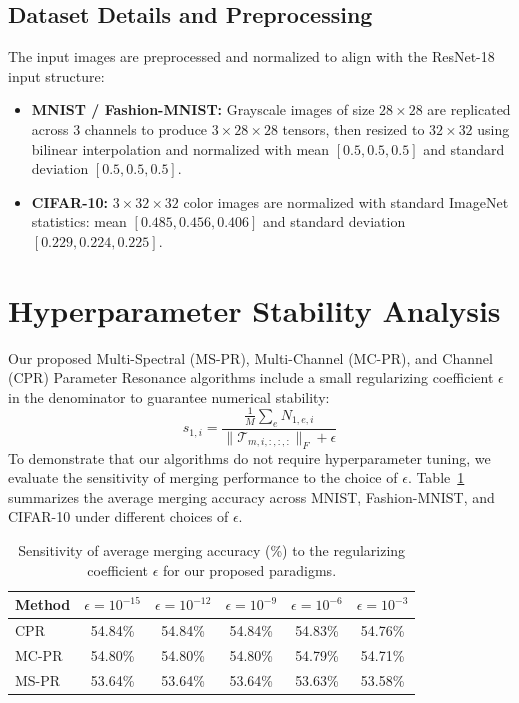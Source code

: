 \documentclass{article}
\theoremstyle{plain}
\theoremstyle{definition}
\theoremstyle{remark}
\begin{document}
\subsection{Dataset Details and Preprocessing}
The input images are preprocessed and normalized to align with the ResNet-18 input structure:
\begin{itemize}
    \item \textbf{MNIST / Fashion-MNIST:} Grayscale images of size $28 \times 28$ are replicated across 3 channels to produce $3 \times 28 \times 28$ tensors, then resized to $32 \times 32$ using bilinear interpolation and normalized with mean $[0.5, 0.5, 0.5]$ and standard deviation $[0.5, 0.5, 0.5]$.
    \item \textbf{CIFAR-10:} $3 \times 32 \times 32$ color images are normalized with standard ImageNet statistics: mean $[0.485, 0.456, 0.406]$ and standard deviation $[0.229, 0.224, 0.225]$.
\end{itemize}

\section{Hyperparameter Stability Analysis}
\label{appendix:stability}
Our proposed Multi-Spectral (MS-PR), Multi-Channel (MC-PR), and Channel (CPR) Parameter Resonance algorithms include a small regularizing coefficient $\epsilon$ in the denominator to guarantee numerical stability:
\begin{equation}
    s_{1, i} = \frac{\frac{1}{M}\sum_e N_{1, e, i}}{\|\mathcal{T}_{m, i, :, :, :}\|_F + \epsilon}
\end{equation}
To demonstrate that our algorithms do not require hyperparameter tuning, we evaluate the sensitivity of merging performance to the choice of $\epsilon$. Table~\ref{tab:epsilon_sensitivity} summarizes the average merging accuracy across MNIST, Fashion-MNIST, and CIFAR-10 under different choices of $\epsilon$.

\begin{table}[h]
\caption{Sensitivity of average merging accuracy (\%) to the regularizing coefficient $\epsilon$ for our proposed paradigms.}
\label{tab:epsilon_sensitivity}
\vskip 0.1in
\begin{center}
\begin{small}
\begin{sc}
\begin{tabular}{lccccc}
\toprule
Method & $\epsilon = 10^{-15}$ & $\epsilon = 10^{-12}$ & $\epsilon = 10^{-9}$ & $\epsilon = 10^{-6}$ & $\epsilon = 10^{-3}$ \\
\midrule
CPR & 54.84\% & 54.84\% & 54.84\% & 54.83\% & 54.76\% \\
MC-PR & 54.80\% & 54.80\% & 54.80\% & 54.79\% & 54.71\% \\
MS-PR & 53.64\% & 53.64\% & 53.64\% & 53.63\% & 53.58\% \\
\bottomrule
\end{tabular}
\end{sc}
\end{small}
\end{center}
\end{table}
\end{document}

